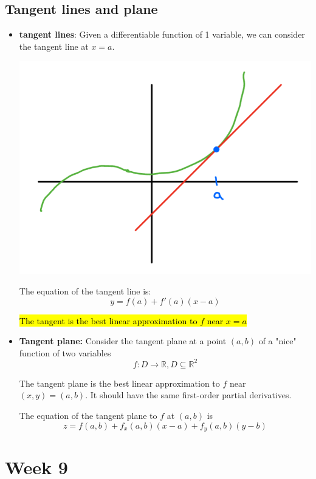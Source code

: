 \documentclass{article}
\begin{document}
  \subsection*{Tangent lines and plane}
  \begin{itemize}
    \item \textbf{tangent lines}: Given a differentiable function of 1 variable, we can consider the tangent line at $x = a$.

    \includegraphics[width=\linewidth]{Graphs/w9_1.png}

    The equation of the tangent line is:
    $$
      y =f(a)+ f'(a)(x-a)
    $$

    \hl{The tangent is the best linear approximation to $f$ near $x = a$}


    \item \textbf{Tangent plane:} Consider the tangent plane at a point $(a,b)$ of a "nice" function of two variables
    $$
      f: D\rightarrow \mathbb{R}, D \subseteq \mathbb{R}^2
    $$

    The tangent plane is the best linear approximation to $f$ near $(x,y) = (a,b)$. It should have the same first-order partial derivatives.

    The equation of the tangent plane to $f$ at $(a,b)$ is
    $$
      z = f(a,b) +f_x(a,b)(x-a) + f_y(a,b)(y-b)
    $$

  \end{itemize}

  \section{Week 9}
\end{document}
